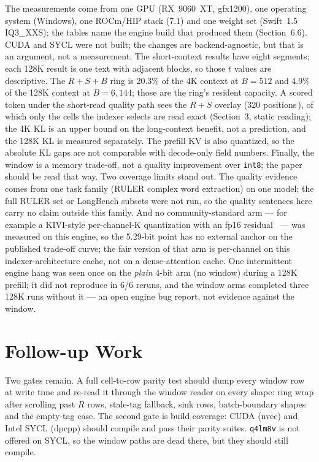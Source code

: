 \documentclass[10pt,twocolumn]{article}
\begin{document}
The measurements come from one GPU (RX~9060~XT, gfx1200), one operating system (Windows), one ROCm/HIP stack (7.1) and one weight set (Swift~1.5 IQ3\_XXS); the tables name the engine build that produced them (Section~6.6). CUDA and SYCL were not built; the changes are backend-agnostic, but that is an argument, not a measurement. The short-context results have eight segments; each 128K result is one text with adjacent blocks, so those $t$ values are descriptive. The $R{+}S{+}B$ ring is 20.3\% of the 4K context at $B{=}512$ and 4.9\% of the 128K context at $B{=}6{,}144$; those are the ring's resident capacity. A scored token under the short-read quality path sees the $R{+}S$ overlay (320 positions\,\cite{strata-wp}), of which only the cells the indexer selects are read exact (Section~3, static reading); the 4K KL is an upper bound on the long-context benefit, not a prediction, and the 128K KL is measured separately. The prefill KV is also quantized, so the absolute KL gaps are not comparable with decode-only field numbers. Finally, the window is a memory trade-off, not a quality improvement over \texttt{int8}; the paper should be read that way. Two coverage limits stand out. The quality evidence comes from one task family (RULER complex word extraction) on one model; the full RULER set or LongBench subsets were not run, so the quality sentences here carry no claim outside this family. And no community-standard arm --- for example a KIVI-style per-channel-K quantization with an fp16 residual~\cite{kivi,kvquant} --- was measured on this engine, so the 5.29-bit point has no external anchor on the published trade-off curve; the fair version of that arm is per-channel on this indexer-architecture cache, not on a dense-attention cache. One intermittent engine hang was seen once on the \emph{plain} 4-bit arm (no window) during a 128K prefill; it did not reproduce in 6/6 reruns, and the window arms completed three 128K runs without it --- an open engine bug report, not evidence against the window.

\section{Follow-up Work}\label{sec:followup}

Two gates remain. A full cell-to-row parity test should dump every window row at write time and re-read it through the window reader on every shape: ring wrap after scrolling past $R$ rows, stale-tag fallback, sink rows, batch-boundary shapes and the empty-tag case. The second gate is build coverage: CUDA (nvcc) and Intel SYCL (dpcpp) should compile and pass their parity suites. \texttt{q4lm8v} is not offered on SYCL, so the window paths are dead there, but they should still compile.
\end{document}
